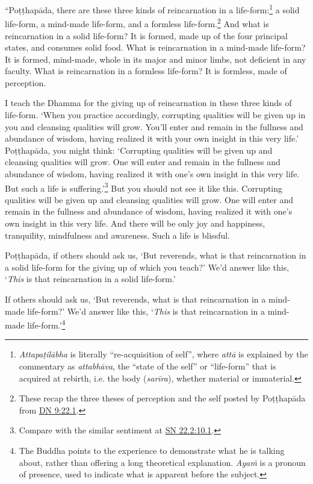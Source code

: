 \documentclass[12pt,openany]{book}%
\begin{document}
“\textsanskrit{Poṭṭhapāda}, there are these three kinds of reincarnation in a life-form:\footnote{\textit{\textsanskrit{Attapaṭilābha}} is literally “re-acquisition of self”, where \textit{\textsanskrit{attā}} is explained by the commentary as \textit{\textsanskrit{attabhāva}}, the “state of the self” or “life-form” that is acquired at rebirth, i.e. the body (\textit{\textsanskrit{sarīra}}), whether material or immaterial. } a solid  life-form, a mind-made life-form, and a formless life-form.\footnote{These recap the three theses of perception and the self posted by \textsanskrit{Poṭṭhapāda} from \href{https://suttacentral.net/dn9/en/sujato\#22.1}{DN 9:22.1}. } And what is reincarnation in a solid life-form? It is formed, made up of the four principal states, and consumes solid food. What is reincarnation in a mind-made life-form? It is formed, mind-made, whole in its major and minor limbs, not deficient in any faculty. What is reincarnation in a formless life-form? It is formless, made of perception. 

I teach the Dhamma for the giving up of reincarnation in these three kinds of life-form. ‘When you practice accordingly, corrupting qualities will be given up in you and cleansing qualities will grow. You’ll enter and remain in the fullness and abundance of wisdom, having realized it with your own insight in this very life.’ \textsanskrit{Poṭṭhapāda}, you might think: ‘Corrupting qualities will be given up and cleansing qualities will grow. One will enter and remain in the fullness and abundance of wisdom, having realized it with one’s own insight in this very life. But such a life is suffering.’\footnote{Compare with the similar sentiment at \href{https://suttacentral.net/sn22.2/en/sujato\#10.1}{SN 22.2:10.1}. } But you should not see it like this. Corrupting qualities will be given up and cleansing qualities will grow. One will enter and remain in the fullness and abundance of wisdom, having realized it with one’s own insight in this very life. And there will be only joy and happiness, tranquility, mindfulness and awareness. Such a life is blissful. 

\textsanskrit{Poṭṭhapāda}, if others should ask us, ‘But reverends, what is that reincarnation in a solid life-form for the giving up of which you teach?’ We’d answer like this, ‘\emph{This} is that reincarnation in a solid life-form.’ 

If others should ask us, ‘But reverends, what is that reincarnation in a mind-made life-form?’ We’d answer like this, ‘\emph{This} is that reincarnation in a mind-made life-form.’\footnote{The Buddha points to the experience to demonstrate what he is talking about, rather than offering a long theoretical explanation. \textit{\textsanskrit{Ayaṁ}} is a pronoun of presence, used to indicate what is apparent before the subject. } 
\end{document}
